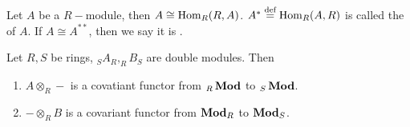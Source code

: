   Let $A$ be a $R-$module, then $A\cong\operatorname{Hom}_R(R,A)$. $A^{\ast}\stackrel{\text{def}}{=}\operatorname{Hom}_R(A,R)$ is called the
   of $A$. If $A\cong A^{\ast\ast}$, then we say it is .

\begin{prop}
  Let $R,S$ be rings, $ _SA_R, _RB_S$ are double modules. Then
  \begin{enumerate}
    \item $A\otimes_R-$ is a covatiant functor from $ _R\operatorname{\mathbf{Mod}}$ to $ _S\operatorname{\mathbf{Mod}}$.
    \item $-\otimes_RB$ is a covariant functor from $\operatorname{\mathbf{Mod}}_R$ to $\operatorname{\mathbf{Mod}}_S$.
  \end{enumerate}
\end{prop}
